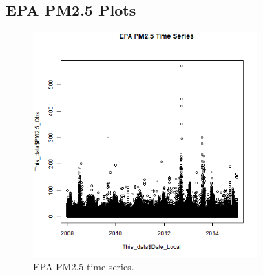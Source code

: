 
\subsection*{EPA PM2.5 Plots}
\begin{figure} 
\centering 
\includegraphics[width=0.77\textwidth]{Code_Outputs/EPA_PM25_time_series.png} 
\caption{\label{fig:EPA_PM25TS}EPA PM2.5 time series.} 
\end{figure} 
 
